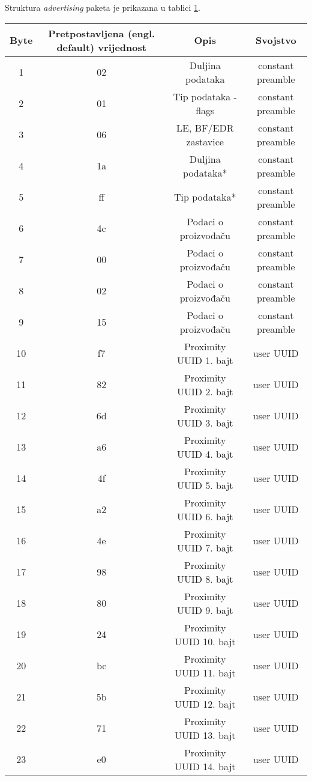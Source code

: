 Struktura \textit{advertising} paketa je prikazana u tablici \ref{tbl:advertising}.
\\
\begin{table}
\label{tbl:advertising}
\begin{tabular}{|c|c|c|c|}
\hline 
Byte & Pretpostavljena (engl. default) vrijednost & Opis & Svojstvo \\ 
\hline 
1 & 02 & Duljina podataka & constant preamble \\ 
\hline 
2 & 01 & Tip podataka - flags & constant preamble \\ 
\hline 
3 & 06 & LE, BF/EDR zastavice & constant preamble \\ 
\hline 
4 & 1a & Duljina podataka* & constant preamble \\ 
\hline 
5 & ff & Tip podataka* & constant preamble \\ 
\hline 
6 & 4c & Podaci o proizvođaču & constant preamble \\ 
\hline 
7 & 00 & Podaci o proizvođaču & constant preamble \\ 
\hline 
8 & 02 & Podaci o proizvođaču & constant preamble \\ 
\hline 
9 & 15 & Podaci o proizvođaču & constant preamble \\ 
\hline 
10 & f7 & Proximity UUID 1. bajt & user UUID \\ 
\hline 
11 & 82 & Proximity UUID 2. bajt & user UUID \\ 
\hline 
12 & 6d & Proximity UUID 3. bajt & user UUID \\ 
\hline 
13 & a6 & Proximity UUID 4. bajt & user UUID \\ 
\hline 
14 & 4f & Proximity UUID 5. bajt & user UUID \\ 
\hline 
15 & a2 & Proximity UUID 6. bajt & user UUID \\ 
\hline 
16 & 4e & Proximity UUID 7. bajt & user UUID \\ 
\hline 
17 & 98 & Proximity UUID 8. bajt & user UUID \\ 
\hline 
18 & 80 & Proximity UUID 9. bajt & user UUID \\ 
\hline 
19 & 24 & Proximity UUID 10. bajt & user UUID \\ 
\hline 
20 & bc & Proximity UUID 11. bajt & user UUID \\ 
\hline 
21 & 5b & Proximity UUID 12. bajt & user UUID \\ 
\hline 
22 & 71 & Proximity UUID 13. bajt & user UUID \\ 
\hline 
23 & e0 & Proximity UUID 14. bajt & user UUID \\ 

\end{tabular}
\end{table}

